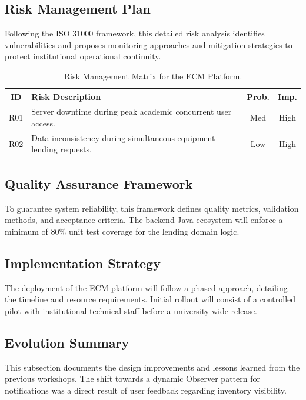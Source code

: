 \documentclass[conference]{IEEEtran}
\begin{document}
\subsection{Risk Management Plan}
Following the ISO 31000 framework, this detailed risk analysis identifies vulnerabilities and proposes monitoring approaches and mitigation strategies to protect institutional operational continuity.

\begin{table}[h]
\centering
\caption{Risk Management Matrix for the ECM Platform.}
\label{tab:risk_matrix_summary}
\small
\renewcommand{\arraystretch}{1.3}
\begin{tabularx}{\linewidth}{|c|>{\raggedright\arraybackslash}X|c|c|}
\hline
\textbf{ID} & \textbf{Risk Description} & \textbf{Prob.} & \textbf{Imp.} \\ \hline
R01 & Server downtime during peak academic concurrent user access. & Med & High \\ \hline
R02 & Data inconsistency during simultaneous equipment lending requests. & Low & High \\ \hline
\end{tabularx}
\end{table}

\subsection{Quality Assurance Framework}
To guarantee system reliability, this framework defines quality metrics, validation methods, and acceptance criteria. The backend Java ecosystem will enforce a minimum of 80\% unit test coverage for the lending domain logic.

\subsection{Implementation Strategy}
The deployment of the ECM platform will follow a phased approach, detailing the timeline and resource requirements. Initial rollout will consist of a controlled pilot with institutional technical staff before a university-wide release.

\subsection{Evolution Summary}
This subsection documents the design improvements and lessons learned from the previous workshops. The shift towards a dynamic Observer pattern for notifications was a direct result of user feedback regarding inventory visibility.
\end{document}
